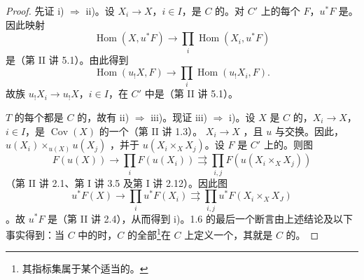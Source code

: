 \begin{proof}
先证 i) $\Rightarrow$ ii)。设 $X_i\to X$，$i\in I$，是 $C$ 的。对 $C'$ 上的每个 $F$，$u^*F$ 是。因此映射
\[
 \operatorname{Hom}(X,u^*F)\longrightarrow\prod_i\operatorname{Hom}(X_i,u^*F)
\]
是（第 II 讲 5.1）。由此得到
\[
 \operatorname{Hom}(u_!X,F)\longrightarrow\prod_i\operatorname{Hom}(u_!X_i,F).
\]
故族 $u_!X_i\to u_!X$，$i\in I$，在 $C'$ 中是（第 II 讲 5.1）。

 $T$ 的每个都是 $C$ 的，故有 ii) $\Rightarrow$ iii)。现证 iii) $\Rightarrow$ i)。设 $X$ 是 $C$ 的，$X_i\to X$，$i\in I$，是 $\operatorname{Cov}(X)$ 的一个（第 II 讲 1.3）。 $X_i\to X$ ，且 $u$ 与交换。因此， $u(X_i)\times_{u(X)}u(X_j)$ ，并于 $u(X_i\times_X X_j)$。设 $F$ 是 $C'$ 上的。则图
\[
 F(u(X))\longrightarrow\prod_i F(u(X_i))\rightrightarrows\prod_{i,j}F(u(X_i\times_X X_j))
\]
（第 II 讲 2.1、第 I 讲 3.5 及第 I 讲 2.12）。因此图
\[
 u^*F(X)\longrightarrow\prod_i u^*F(X_i)\rightrightarrows\prod_{i,j}u^*F(X_i\times_X X_J)
\]
。故 $u^*F$ 是（第 II 讲 2.4），从而得到 i)。1.6 的最后一个断言由上述结论及以下事实得到：当 $C$ 中的时，$C$ 的全部\footnote{其指标集属于某个适当的。}在 $C$ 上定义一个，其就是 $C$ 的。
\end{proof}

